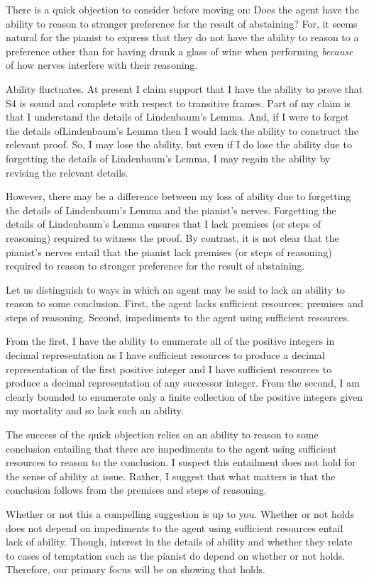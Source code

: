 \begin{note}
  There is a quick objection to consider before moving on:
  Does the agent have the ability to reason to stronger preference for the result of abstaining?
  For, it seems natural for the pianist to express that they do not have the ability to reason to a preference other than for having drunk a glass of wine when performing \emph{because} of how nerves interfere with their reasoning.

  Ability fluctuates.
  At present I claim support that I have the ability to prove that S4 is sound and complete with respect to transitive frames.
  Part of my claim is that I understand the details of Lindenbaum's Lemma.
  And, if I were to forget the details ofLindenbaum's Lemma then I would lack the ability to construct the relevant proof.
  So, I may lose the ability, but even if I do lose the ability due to forgetting the details of Lindenbaum's Lemma, I may regain the ability by revising the relevant details.

  However, there may be a difference between my loss of ability due to forgetting the details of Lindenbaum's Lemma and the pianist's nerves.
  Forgetting the details of Lindenbaum's Lemma ensures that I lack premises (or steps of reasoning) required to witness the proof.
  By contrast, it is not clear that the pianist's nerves entail that the pianist lack premises (or steps of reasoning) required to reason to stronger preference for the result of abstaining.

  Let us distinguish to ways in which an agent may be said to lack an ability to reason to some conclusion.
  First, the agent lacks sufficient resources; premises and steps of reasoning.
  Second, impediments to the agent using sufficient resources.

  From the first, I have the ability to enumerate all of the positive integers in decimal representation as I have sufficient resources to produce a decimal representation of the first positive integer and I have sufficient resources to produce a decimal representation of any successor integer.
  From the second, I am clearly bounded to enumerate only a finite collection of the positive integers given my mortality and so lack such an ability.

  The success of the quick objection relies on an ability to reason to some conclusion entailing that there are impediments to the agent using sufficient resources to reason to the conclusion.
  I suspect this entailment does not hold for the sense of ability at issue.
  Rather, I suggest that what matters is that the conclusion follows from the premises and steps of reasoning.

  Whether or not this a compelling suggestion is up to you.
  Whether or not \EAS{} holds does not depend on impediments to the agent using sufficient resources entail lack of ability.
  Though, interest in the details of ability and whether they relate to cases of temptation such as the pianist do depend on whether or not \EAS{} holds.
  Therefore, our primary focus will be on showing that \EAS{} holds.
\end{note}

